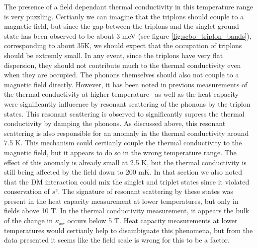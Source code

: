 \documentclass{thesis-umich}
\begin{document}
The presence of a field dependant thermal conductivity in this temperature range is very puzzling. Certianly we can imagine that the triplons should couple to a magnetic field, but since the gap between the triplons and the singlet ground state has been observed to be about 3 meV (see figure \ref{fig:scbo_triplon_bands}), corresponding to about 35K, we should expect that the occupation of triplons should be extremly small. In any event, since the triplons have very flat dispersion, they should not contribute much to the thermal conductivity even when they are occupied. The phonons themselves should also not couple to a magnetic field directly. However, it has been noted in previous measurements of the thermal conductivity at higher temperature~\cite{Hofmann2001} as well as the heat capacity~\cite{Jorge2005} were significantly influcence by resonant scattering of the phonons by the triplon states. This resonant scattering is observed to significantly supress the thermal conductivity by damping the phonons. As discussed above, this resonant scattering is also responsible for an anomaly in the thermal conductivity around 7.5 K. This mechanism could certianly couple the thermal conductivity to the magnetic field, but it appears to do so in the wrong temperature range. The effect of this anomaly is already small at 2.5 K, but the thermal conductivity is still being affected by the field down to 200 mK. In that section we also noted that the DM interaction could mix the singlet and triplet states since it violated conservation of $s^z$. The signature of resonant scattering by these states was present in the heat capacity measurement at lower temperatures, but only in fields above 10 T. In the thermal conductivity measurement, it appears the bulk of the change in $\kappa_{xx}$ occurs below 5 T. Heat capacity measurements at lower temperatures would certianly help to disambiguate this phenomena, but from the data presented it seems like the field scale is wrong for this to be a factor.
\end{document}
